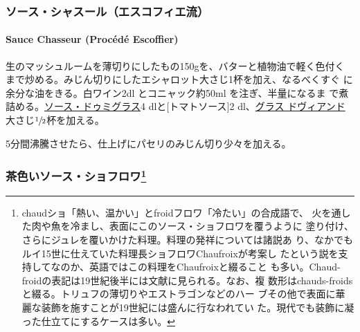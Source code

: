 \maeaki

\hypertarget{ux30bdux30fcux30b9ux30b7ux30e3ux30b9ux30fcux30ebux30a8ux30b9ux30b3ux30d5ux30a3ux30a8ux6d41}{%
\subsubsection{ソース・シャスール（エスコフィエ流）}\label{ux30bdux30fcux30b9ux30b7ux30e3ux30b9ux30fcux30ebux30a8ux30b9ux30b3ux30d5ux30a3ux30a8ux6d41}}

\hypertarget{sauce-chasseur-procede-escoffier}{%
\paragraph{Sauce Chasseur (Procédé
Escoffier)}\label{sauce-chasseur-procede-escoffier}}


生のマッシュルームを薄切りにしたもの150gを、バターと植物油で軽く色付く
まで炒める。みじん切りにしたエシャロット大さじ1杯を加え、なるべくすぐ
に余分な油をきる。白ワイン2dl とコニャック約50ml を注ぎ、半量になるま
で煮詰める。\protect\hyperlink{sauce-demi-glace}{ソース・ドゥミグラス}4
dlと{[}トマトソース{]}2 dl、\protect\hyperlink{glace-de-viande}{グラス
ドヴィアンド}大さじ\(\sfrac{1}{2}\)杯を加える。

5分間沸騰させたら、仕上げにパセリのみじん切り少々を加える。

\maeaki

\hypertarget{ux8336ux8272ux3044ux30bdux30fcux30b9ux30b7ux30e7ux30d5ux30edux30ef15}{%
\subsubsection[茶色いソース・ショフロワ]{\texorpdfstring{茶色いソース・ショフロワ\footnote{chaudショ「熱い、温かい」とfroidフロワ「冷たい」の合成語で、
  火を通した肉や魚を冷まし、表面にこのソース・ショフロワを覆うように
  塗り付け、さらにジュレを覆いかけた料理。料理の発祥については諸説あ
  り、なかでもルイ15世に仕えていた料理長ショフロワChaufroixが考案し
  たという説を支持してなのか、英語ではこの料理をChaufroixと綴ること
  も多い。Chaud-froidの表記は19世紀後半には文献に見られる。なお、複
  数形はchauds-froidsと綴る。トリュフの薄切りやエストラゴンなどのハー
  ブその他で表面に華麗な装飾を施すことが19世紀には盛んに行なわれてい
  た。現代でも装飾に凝った仕立てにするケースは多い。}}{茶色いソース・ショフロワ}}\label{ux8336ux8272ux3044ux30bdux30fcux30b9ux30b7ux30e7ux30d5ux30edux30ef15}}

